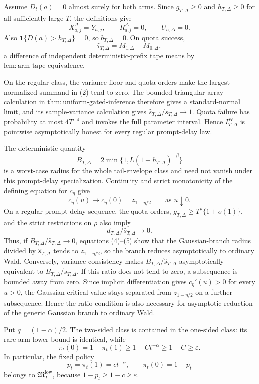 Assume \(D_t(a)=0\) almost surely for both arms.  Since \(g_{T,\Delta}\geq0\) and \(h_{T,\Delta}\geq0\) for all sufficiently large \(T\), the definitions give
\[
 X_{a,j}^{\Delta}=Y_{a,j},\qquad R_{a,j}^{\Delta}=0,
 \qquad U_{a,\Delta}=0. \tag{1}
\]
Also \(\mathbf 1\{D(a)>h_{T,\Delta}\}=0\), so \(b_{T,\Delta}=0\).  On quota success,
\[
 \widehat\tau_{T,\Delta}=M_{1,\Delta}-M_{0,\Delta}, \tag{2}
\]
a difference of independent deterministic-prefix tape means by \(\mathrm{lem:arm\text{-}tape\text{-}equivalence}\).

On the regular class, the variance floor and quota orders make the largest normalized summand in (2) tend to zero.  The bounded triangular-array calculation in \(\mathrm{thm:uniform\text{-}gated\text{-}inference}\) therefore gives a standard-normal limit, and its sample-variance calculation gives \(\widehat s_{T,\Delta}/s_{T,\Delta}\to1\).  Quota failure has probability at most \(4T^{-4}\) and invokes the full parameter interval.  Hence \(I_{T,\Delta}^{\mathrm W}\) is pointwise asymptotically honest for every regular prompt-delay law.

The deterministic quantity
\[
 B_{T,\Delta}=2\min\{1,L(1+h_{T,\Delta})^{-\beta}\} \tag{3}
\]
is a worst-case radius for the whole tail-envelope class and need not vanish under this prompt-delay specialization.  Continuity and strict monotonicity of the defining equation for \(c_\eta\) give
\[
 c_\eta(u)\longrightarrow c_\eta(0)=z_{1-\eta/2}
 \qquad\text{as }u\downarrow0. \tag{4}
\]
On a regular prompt-delay sequence, the quota orders, \(g_{T,\Delta}\geq T^\rho\{1+o(1)\}\), and the strict restrictions on \(\rho\) also imply
\[
 d_{T,\Delta}/\widehat s_{T,\Delta}\longrightarrow0. \tag{5}
\]
Thus, if \(B_{T,\Delta}/\widehat s_{T,\Delta}\to0\), equations (4)--(5) show that the Gaussian-branch radius divided by \(\widehat s_{T,\Delta}\) tends to \(z_{1-\eta/2}\), so the branch reduces asymptotically to ordinary Wald.  Conversely, variance consistency makes \(B_{T,\Delta}/\widehat s_{T,\Delta}\) asymptotically equivalent to \(B_{T,\Delta}/s_{T,\Delta}\).  If this ratio does not tend to zero, a subsequence is bounded away from zero.  Since implicit differentiation gives \(c_\eta'(u)>0\) for every \(u>0\), the Gaussian critical value stays separated from \(z_{1-\eta/2}\) on a further subsequence.  Hence the ratio condition is also necessary for asymptotic reduction of the generic Gaussian branch to ordinary Wald.

Put \(q=(1-\alpha)/2\).  The two-sided class is contained in the one-sided class: its rare-arm lower bound is identical, while
\[
 \pi_t(0)=1-\pi_t(1)\geq1-Ct^{-\alpha}\geq1-C\geq\varepsilon. \tag{1}
\]
In particular, the fixed policy
\[
 p_t=\pi_t(1)=ct^{-\alpha},\qquad \pi_t(0)=1-p_t \tag{2}
\]
belongs to \(\mathfrak M_T^{\mathrm{low}}\), because \(1-p_t\geq1-c\geq\varepsilon\).

